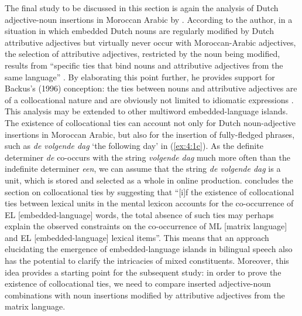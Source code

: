 The final study to be discussed in this section is again the analysis of Dutch adjective-noun insertions in Moroccan Arabic by \citet{boumans-syntax-1998}. According to the author, in a situation in which embedded Dutch nouns are regularly modified by Dutch attributive adjectives but virtually never occur with Moroccan-Arabic adjectives, the selection of attributive adjectives, restricted by the noun being modified, results from ``specific ties that bind nouns and attributive adjectives from the same language'' \citep[][220]{boumans-syntax-1998}. By elaborating this point further, he provides support for Backus's (1996) conception: the ties between nouns and attributive adjectives are of a collocational nature and are obviously not limited to idiomatic expressions \citep[cf.][386--387]{boumans-syntax-1998}. This analysis may be extended to other multiword embedded-language islands. The existence of collocational ties can account not only for Dutch noun-adjective insertions in Moroccan Arabic, but also for the insertion of fully-fledged phrases, such as \textit{de volgende dag} `the following day' in (\ref{ex:4:1c}). As the definite determiner \textit{de} co-occurs with the string \textit{volgende dag} much more often than the indefinite determiner \textit{een}, we can assume that the string \textit{de volgende dag} is a unit, which is stored and selected as a whole in online production. \citet[][386--387]{boumans-syntax-1998} concludes the section on collocational ties by suggesting that ``[i]f the existence of collocational ties between lexical units in the mental lexicon accounts for the co-occurrence of EL [embedded-language] words, the total absence of such ties may perhaps explain the observed constraints on the co-occurrence of ML [matrix language] and EL [embedded-language] lexical items''. This means that an approach elucidating the emergence of embedded-language islands in bilingual speech also has the potential to clarify the intricacies of mixed constituents. Moreover, this idea provides a starting point for the subsequent study: in order to prove the existence of collocational ties, we need to compare inserted adjective-noun combinations with noun insertions modified by attributive adjectives from the matrix language.

